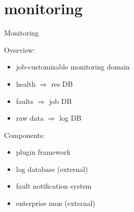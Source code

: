 \documentclass[default,pdf,colorBG,slideColor]{prosper}
\begin{document}
\part{monitoring}
\begin{slide}{Monitoring}{\small
\begin{minipage}{0.40\textwidth}
Overview:
\begin{itemize}
  \item{job-customizable monitoring domain}
  \item{health $\Longrightarrow$ res DB}
  \item{faults $\Longrightarrow$ job DB}
  \item{raw data $\Longrightarrow$ log DB}
\end{itemize}
\end{minipage}
\hfill
\begin{minipage}{0.50\textwidth}
Components:
\begin{itemize}
  \item{plugin framework}
  \item{log database (external)}
  \item{fault notification system}
  \item{enterprise mon (external)}
\end{itemize}
\end{minipage}
\vspace{0.5cm}
\begin{center}
\end{center}
}\end{slide}
\end{document}
